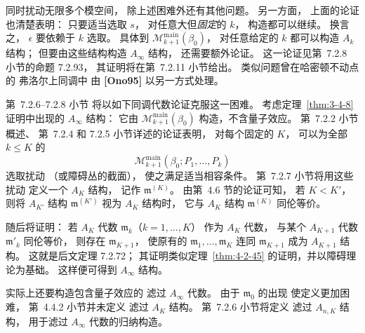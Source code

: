 同时扰动无限多个模空间，
除上述困难外还有其他问题。
另一方面，
上面的论证也清楚表明：
只要适当选取 $s$，
对任意大但\emph{固定}的 $k$，
构造都可以继续。
换言之，
$\epsilon$ 要依赖于 $k$ 选取。
具体到
$\mathcal M^{\mathrm{main}}_{k+1}(\beta_0)$，
对任意给定的 $k$
都可以构造 $A_k$ 结构；
但要由这些结构构造
$A_\infty$ 结构，
还需要额外论证。
这一论证见第~7.2.8 小节的命题 7.2.93，
其证明将在第~7.2.11 小节给出。
类似问题曾在哈密顿不动点的
弗洛尔上同调中
由 \textbf{[Ono95]} 以另一方式处理。

第~7.2.6--7.2.8 小节
将以如下同调代数论证克服这一困难。
考虑定理~\ref{thm:3-4-8}
证明中出现的 $A_\infty$ 结构：
它由
$\mathcal M^{\mathrm{main}}_{k+1}(\beta_0)$
构造，不含量子效应。
第~7.2.2 小节概述、
第~7.2.4 和 7.2.5 小节详述的论证表明，
对每个固定的 $K$，
可以为全部 $k\le K$ 的
\[
\mathcal M^{\mathrm{main}}_{k+1}
(\beta_0;P_1,\ldots,P_k)
\]
选取扰动
（或障碍丛的截面），
使之满足适当相容条件。
第~7.2.7 小节将用这些扰动
定义一个 $A_K$ 结构，
记作 $\mathfrak m^{(K)}$。
由第~4.6 节的论证可知，
若 $K<K'$，
则将 $A_{K'}$ 结构
$\mathfrak m^{(K')}$
视为 $A_K$ 结构时，
它与 $A_K$ 结构
$\mathfrak m^{(K)}$
同伦等价。

随后将证明：
若 $A_K$ 代数
$\mathfrak m_k$（$k=1,\ldots,K$）
作为 $A_K$ 代数，
与某个 $A_{K+1}$ 代数
$\mathfrak m'_k$
同伦等价，
则存在 $\mathfrak m_{K+1}$，
使原有的
$\mathfrak m_1,\ldots,\mathfrak m_K$
连同 $\mathfrak m_{K+1}$
成为 $A_{K+1}$ 结构。
这就是后文定理 7.2.72；
其证明类似定理~\ref{thm:4-2-45}
的证明，并以障碍理论为基础。
这样便可得到 $A_\infty$ 结构。

实际上还要构造包含量子效应的
滤过 $A_\infty$ 代数。
由于 $\mathfrak m_0$ 的出现
使定义更加困难，
第~4.4.2 小节并未定义
滤过 $A_K$ 结构。
第~7.2.6 小节将定义
滤过 $A_{n,K}$ 结构，
用于滤过 $A_\infty$ 代数的归纳构造。
